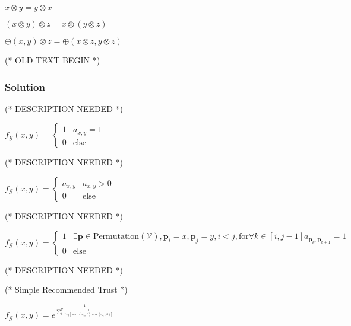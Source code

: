 \documentclass{article}
\begin{document}
\item \(x\otimes y=y\otimes x\)


\item \((x\otimes y)\otimes z=x\otimes (y\otimes z)\)


\item \(\oplus (x,y)\otimes z=\oplus (x\otimes z,y\otimes z)\)



(* OLD TEXT BEGIN *)


\subsubsection{Solution}





(* DESCRIPTION NEEDED *)

\(f_{\mathcal{G}}(x,y)=\begin{cases}
 1 & a_{x,y}=1 \\
 0 & \text{else}
\end{cases}\)





(* DESCRIPTION NEEDED *)

\(f_{\mathcal{G}}(x,y)=\begin{cases}
 a_{x,y} & a_{x,y}>0 \\
 0 & \text{else}
\end{cases}\)





(* DESCRIPTION NEEDED *)

\(f_{\mathcal{G}}(x,y)=\begin{cases}
 1 & \exists \pmb{p}\in \text{Permutation}(\mathcal{V}),\pmb{p}_i=x,\pmb{p}_j=y,i<j,\text{for} \forall k\in [i,j-1] a_{\pmb{p}_k,\pmb{p}_{k+1}}=1
\\
 0 & \text{else}
\end{cases}\)





(* DESCRIPTION NEEDED *)



(* Simple Recommended Trust *)

\(f_{\mathcal{G}}(x,y)=e^{\frac{1}{\sum _i^{\mathcal{V}} \frac{1}{\text{Log}\left[\max \left(a_{i,y},0\right) \max \left(a_{x,i},0\right)\right]}}}\)
\end{document}
